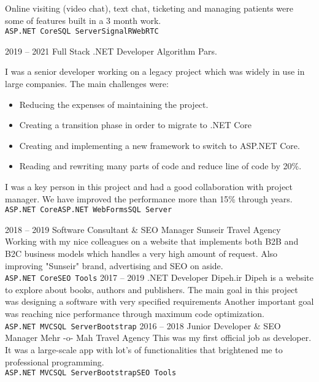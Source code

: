 \documentclass[a4paper]{developercv} %
\begin{document}
\begin{entrylist}
{\begin{itemize}[noitemsep]
	\end{itemize}
	Online visiting (video chat), text chat, ticketing and managing patients were some of features built in a 3 month work.
		\\\texttt{ASP.NET Core}\slashsep\texttt{SQL Server}\slashsep\texttt{SignalR}\slashsep\texttt{WebRTC}}
	\entry
	{2019 -- 2021}
	{Full Stack .NET Developer}
	{Algorithm Pars.}
	{I was a senior developer working on a legacy project which was widely in use in large companies. The main challenges were:
	\begin{itemize}[noitemsep]
		\item Reducing the expenses of maintaining the project.
		\item Creating a transition phase in order to migrate to .NET Core
		\item Creating and implementing a new framework to switch to ASP.NET Core.
            \item Reading and rewriting many parts of code and reduce line of code by 20\%.
	\end{itemize}
	I was a key person in this project and had a good collaboration with project manager. We have improved the performance more than 15\% through years.
		\\\texttt{ASP.NET Core}\slashsep\texttt{ASP.NET WebForms}\slashsep\texttt{SQL Server}}
	\entry
	{2018 -- 2019}
	{Software Consultant \& SEO Manager}
	{Sunseir Travel Agency}
	{Working with my nice colleagues on a website that implements both B2B and B2C business models which handles a very high amount of request. Also improving "Sunseir" brand, advertising and SEO on aside.
		\\\texttt{ASP.NET Core}\slashsep\texttt{SEO Tools}}
	\entry
	{2017 -- 2019}
	{.NET Developer}
	{Dipeh.ir}
	{Dipeh is a website to explore about books, authors and publishers. The main goal in this project was designing a software with very specified requirements Another important goal was reaching nice performance through maximum code optimization.
		\\\texttt{ASP.NET MVC}\slashsep\texttt{SQL Server}\slashsep\texttt{Bootstrap}}
	\entry
	{2016 -- 2018}
	{Junior Developer \& SEO Manager}
	{Mehr -o- Mah Travel Agency}
	{This was my first official job as developer. It was a large-scale app with lot's of functionalities that brightened me to professional programming.
		\\\texttt{ASP.NET MVC}\slashsep\texttt{SQL Server}\slashsep\texttt{Bootstrap}\slashsep\texttt{SEO Tools}}
\end{entrylist}
\end{document}
